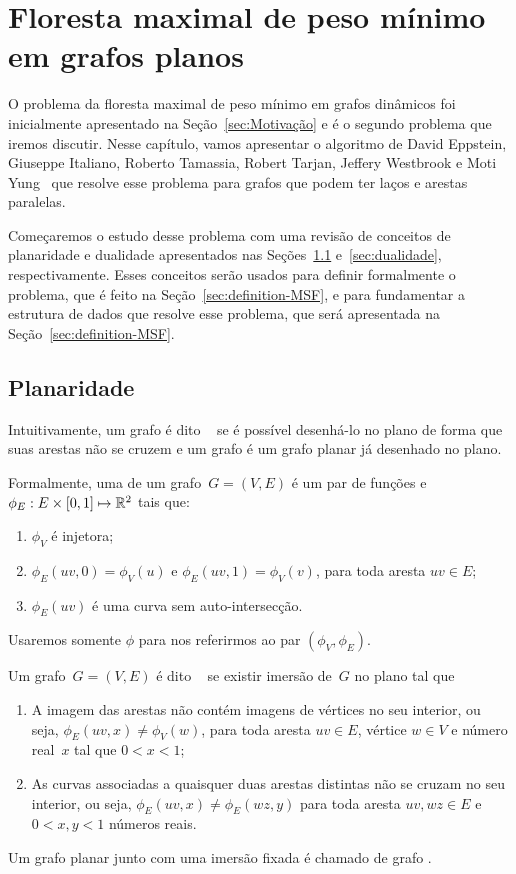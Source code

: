 \chapter{Floresta maximal de peso mínimo em grafos planos}
\label{sec:MSF}

O problema da floresta maximal de peso mínimo em grafos dinâmicos foi inicialmente apresentado na Seção~\ref{sec:Motivação} e é o segundo problema que iremos discutir.
Nesse capítulo, vamos apresentar o algoritmo de David Eppstein, Giuseppe Italiano, Roberto Tamassia, Robert Tarjan, Jeffery Westbrook e Moti Yung~\cite{EPPSTEIN-planar} que resolve esse problema para grafos que podem ter laços e arestas paralelas.

Começaremos o estudo desse problema com uma revisão de conceitos de planaridade e dualidade apresentados nas Seções~\ref{sec:planaridade} e~\ref{sec:dualidade}, respectivamente.
Esses conceitos serão usados para definir formalmente o problema, que é feito na Seção~\ref{sec:definition-MSF}, e para fundamentar a estrutura de dados que resolve esse problema, que será apresentada na Seção~\ref{sec:definition-MSF}.


\section{Planaridade}
\label{sec:planaridade}

Intuitivamente, um grafo é dito ~\cite{planarTheoryAlgorith} se é possível desenhá-lo no plano de forma que suas arestas não se cruzem e um grafo  é um grafo planar já desenhado no plano.

Formalmente, uma  de um grafo~$G=(V,E)$ é um par de funções  e $\phi_E: E\times [0,1]\mapsto \mathbb{R}^2$ tais que:
\begin{enumerate}
\item $\phi_V$ é injetora; 
\item $\phi_E(uv,0) = \phi_V(u)$ e $\phi_E(uv,1) = \phi_V(v)$, para toda aresta $uv\in E$;
\item $\phi_E(uv)$ é uma curva sem auto-intersecção.
\end{enumerate}
Usaremos somente $\phi$ para nos referirmos ao par $(\phi_V,\phi_E)$.

Um grafo~$G=(V,E)$ é dito ~\cite{noma2003} se existir imersão de~$G$ no plano tal que
\begin{enumerate}
\item A imagem das arestas não contém imagens de vértices no seu interior, ou seja, $\phi_E(uv,x) \neq \phi_V(w)$, para toda aresta $uv\in E$, vértice $w\in V$ e número real~$x$ tal que $0<x<1$;
\item As curvas associadas a quaisquer duas arestas distintas não se cruzam no seu interior, ou seja, $\phi_E(uv,x)\neq \phi_E(wz,y)$ para toda aresta $uv,wz\in E$ e $0<x,y<1$ números reais.
\end{enumerate}
Um grafo planar junto com uma imersão fixada é chamado de grafo .

